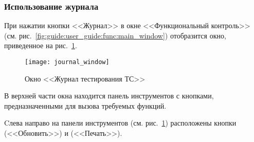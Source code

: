 






\subsubsection{Использование журнала}
\label{sub:guide:user_guide:journal}
При нажатии кнопки <<Журнал>> в окне <<Функциональный контроль>>
(см. рис.~\ref{fig:guide:user_guide:func:main_window}) отобразится окно, приведенное на
рис.~\ref{fig:guide:user_guide:journal:journal_window}.

\begin{figure}[htb]
	\centering
	\texttt{[image: journal\_window]}
	\caption{Окно <<Журнал тестирования ТС>>}
	\label{fig:guide:user_guide:journal:journal_window}
\end{figure}

В верхней части окна находится панель инструментов с кнопками, предназначенными для вызова требуемых функций.

Cлева направо на панели инструментов (см. рис.~\ref{fig:guide:user_guide:journal:journal_window}) расположены кнопки
(<<Обновить>>) и (<<Печать>>).

